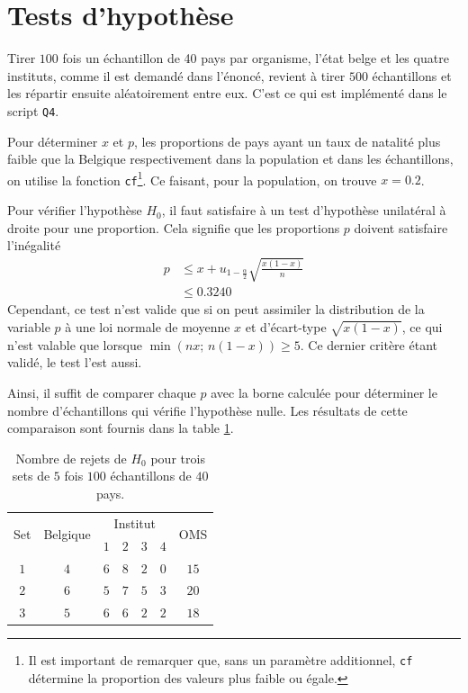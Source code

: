 \documentclass[a4paper, 12pt]{article}
\begin{document}
	\section{Tests d'hypothèse} \label{sec:Q4}
	Tirer $100$ fois un échantillon de 40 pays par organisme, \cad l'état belge et les quatre instituts, comme il est demandé dans l'énoncé, revient à tirer $\num{500}$ échantillons et les répartir ensuite aléatoirement entre eux. C'est ce qui est implémenté dans le script \texttt{Q4}. \par
	Pour déterminer $x$ et $p$, les proportions de pays ayant un taux de natalité plus faible que la Belgique respectivement dans la population et dans les échantillons, on utilise la fonction \texttt{cf}\footnote{Il est important de remarquer que, sans un paramètre additionnel, \texttt{cf} détermine la proportion des valeurs \og{}plus faible ou égale\fg{}.}. Ce faisant, pour la population, on trouve $x = \num{0.2}$. \par
	Pour vérifier l'hypothèse $H_{0}$, il faut satisfaire à un test d'hypothèse unilatéral à droite pour une proportion. Cela signifie que les proportions $p$ doivent satisfaire l'inégalité
	\begin{align*}
	    p & \leq x + u_{1 - \frac{\alpha}{2}} \sqrt{\frac{x (1 - x)}{n}} \\
	      & \leq \num{0.3240}
	\end{align*}
	Cependant, ce test n'est valide que si on peut assimiler la distribution de la variable $p$ à une loi normale de moyenne $x$ et d'écart-type $\sqrt{x (1 - x)}$, ce qui n'est valable que lorsque $\min{\left(n x; \, n(1 - x)\right)} \geq 5$. Ce dernier critère étant validé, le test l'est aussi. \par
	Ainsi, il suffit de comparer chaque $p$ avec la borne calculée pour déterminer le nombre d'échantillons qui vérifie l'hypothèse nulle. Les résultats de cette comparaison sont fournis dans la table \ref{table:Q4}. \par
	\begin{table}[h!]
		\centering
		\begin{tabular}{|c|c|c|c|c|c|c|}
			\hline
			\multirow{2}{*}{Set} & \multirow{2}{*}{Belgique} & \multicolumn{4}{c|}{Institut} & \multirow{2}{*}{OMS} \\ \cline{3-6}
			                     &                           & $1$ & $2$ & $3$ &     $4$     &                      \\ \hline\hline
			        $1$          &            $4$            & $6$ & $8$ & $2$ &     $0$     &         $15$         \\ \hline
			        $2$          &            $6$            & $5$ & $7$ & $5$ &     $3$     &         $20$         \\ \hline
			        $3$          &            $5$            & $6$ & $6$ & $2$ &     $2$     &         $18$         \\ \hline
		\end{tabular}
		\caption{Nombre de rejets de $H_{0}$ pour trois sets de $5$ fois $100$ échantillons de $40$ pays.}
		\label{table:Q4}
	\end{table}
\end{document}
